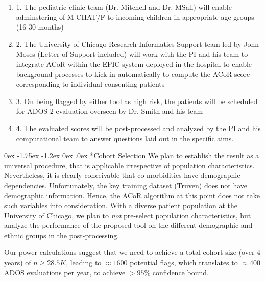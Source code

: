 \documentclass[onecolumn, compsoc,11pt]{IEEEtran}
\makeatletter
\renewcommand\subsection{\@startsection {subsection}{2}{\z@}%
                                   {0ex \@plus -1.75ex \@minus -1.2ex}%
                                   {0ex \@plus.0ex}%
                                   {\fontsize{11}{11}\selectfont\bfseries\sffamily\color{black}}}
\def\ZERO{ACoR\xspace}
\makeatother
\begin{document}
\begin{enumerate} 
[label=$\square$, leftmargin=0pt,
labelindent=0em, topsep=0.1em, labelsep=*, itemsep=.5em,itemindent=1em]
 \item 1. The pediatric clinic team (Dr. Mitchell and Dr. MSall) will enable adminstering of M-CHAT/F to incoming children in appropriate age groups (16-30 months)
\item 2. The University of Chicago Research Informatics Support team led by John Moses (Letter of Support included)  will work with the PI and his team to integrate \ZERO within the EPIC system deployed in the hospital to  enable background processes to kick in  automatically to compute the \ZERO score corresponding to individual consenting patients
\item 3. On being flagged by either tool as high risk, the patients will be scheduled for ADOS-2 evaluation overseen by Dr. Smith and his team
\item 4. The evaluated scores will be post-processed  and analyzed by the PI and his computational team to answer questions laid out in the specific aims.
\end{enumerate}

\subsection*{Cohort Selection} We plan to establish the result as a universal procedure, that is applicable irrespective of population characteristics. Nevertheless, it is clearly conceivable that co-morbidities have demographic dependencies. Unfortunately, the key training dataset (Truven) does not have demographic information. Hence, the \ZERO algorithm at this point does not take such variables into consideration. With a diverse patient population at the University of Chicago, we plan to \textit{not} pre-select population characteristics, but analyze the performance of the proposed tool on the different demographic and ethnic groups in the post-processing.

Our power calculations suggest that we need to achieve a total cohort size (over $4$ years) of $n\geq 28.5K$, leading to  $\approx 1600$ potential flags, which translates to $\approx 400$ ADOS evaluations per year, to achieve $> 95\%$ confidence bound.
\end{document}
